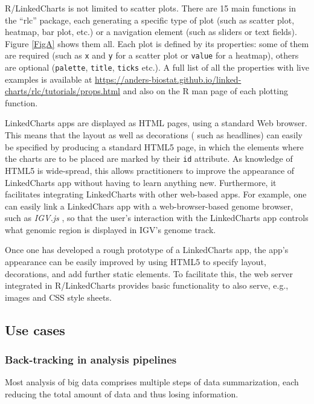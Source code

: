 \documentclass[twocolumn,10pt]{article}
\begin{document}
R/LinkedCharts is not limited to scatter plots. There are 15 main functions in the ``rlc'' package, each generating a specific type of plot (such as scatter plot, heatmap, bar plot, etc.) or a navigation element (such as sliders or text fields). Figure \ref{FigA} shows them all. Each plot is defined by its properties: some of them are required (such as \texttt{x} and \texttt{y} for a scatter plot or \texttt{value} for a heatmap), others are optional (\texttt{palette}, \texttt{title}, \texttt{ticks} etc.). A full list of all the properties with live examples is available at \url{https://anders-biostat.github.io/linked-charts/rlc/tutorials/props.html} and also on the R man page of each plotting function.

LinkedCharts apps are displayed as HTML pages, using a standard Web browser. This means that the layout as well as decorations ( such as headlines) can easily be specified by producing a standard HTML5 page, in which the elements where the charts are to be placed are marked by their \texttt{id} attribute. As knowledge of HTML5 is wide-spread, this allows practitioners to improve the appearance of LinkedCharts app without having to learn anything new. Furthermore, it facilitates integrating LinkedCharts with other web-based apps. For example, one can easily link a LinkedChars app with a web-browser-based genome browser, such as \emph{IGV.js} \cite{robinson_2020}, so that the user's interaction with the LinkedCharts app controls what genomic region is displayed in IGV's genome track.

Once one has developed a rough prototype of a LinkedCharts app, the app's appearance can be easily improved by using HTML5 to specify layout, decorations, and add further static elements. To facilitate this, the web server integrated in R/LinkedCharts provides basic functionality to also serve, e.g., images and CSS style sheets.

\subsection{Use cases}
\subsubsection{Back-tracking in analysis pipelines}

Most analysis of big data comprises multiple steps of data summarization, each reducing the total amount of data and thus losing information.
\end{document}

